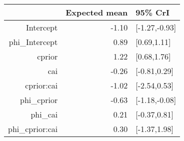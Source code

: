\begin{tabular}{rrl}
  \hline
 & Expected mean & 95\% CrI \\ 
  \hline
Intercept & -1.10 & [-1.27,-0.93] \\ 
  phi\_Intercept & 0.89 & [0.69,1.11] \\ 
  cprior & 1.22 & [0.68,1.76] \\ 
  cai & -0.26 & [-0.81,0.29] \\ 
  cprior:cai & -1.02 & [-2.54,0.53] \\ 
  phi\_cprior & -0.63 & [-1.18,-0.08] \\ 
  phi\_cai & 0.21 & [-0.37,0.81] \\ 
  phi\_cprior:cai & 0.30 & [-1.37,1.98] \\ 
   \hline
\end{tabular}

